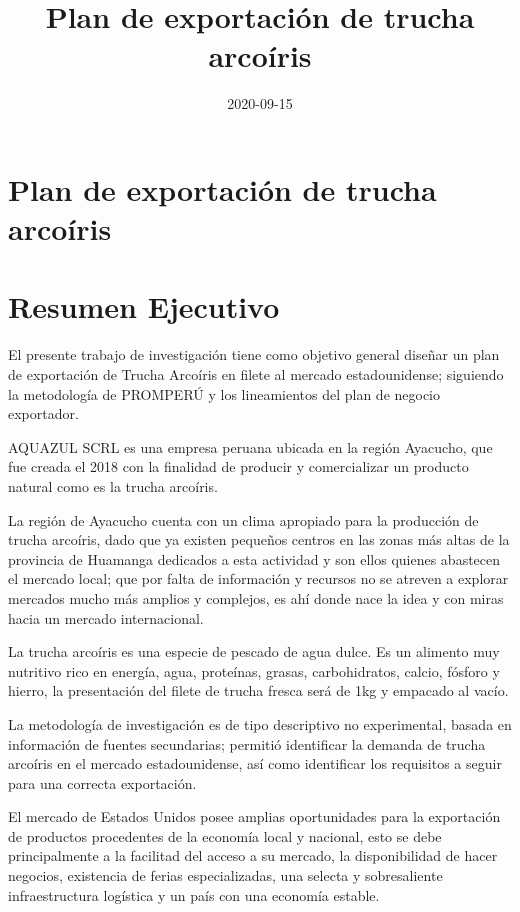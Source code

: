 \documentclass[
  stu,
  floatsintext,
  longtable,
  a4paper,
  nolmodern,
  notxfonts,
  notimes,
  12pt,
  colorlinks=true,linkcolor=blue,citecolor=blue,urlcolor=blue]{apa7}
\title{Plan de exportación de trucha arcoíris}
\date{2020-09-15}
\begin{document}
\maketitle


\hypertarget{toc}{}
\tableofcontents
\newpage
\section[Introduction]{Plan de exportación de trucha arcoíris}

\setcounter{secnumdepth}{3}

\setlength\LTleft{0pt}




\section{Resumen Ejecutivo}\label{resumen-ejecutivo}

El presente trabajo de investigación tiene como objetivo general diseñar
un plan de exportación de Trucha Arcoíris en filete al mercado
estadounidense; siguiendo la metodología de PROMPERÚ y los lineamientos
del plan de negocio exportador.

AQUAZUL SCRL es una empresa peruana ubicada en la región Ayacucho, que
fue creada el 2018 con la finalidad de producir y comercializar un
producto natural como es la trucha arcoíris.

La región de Ayacucho cuenta con un clima apropiado para la producción
de trucha arcoíris, dado que ya existen pequeños centros en las zonas
más altas de la provincia de Huamanga dedicados a esta actividad y son
ellos quienes abastecen el mercado local; que por falta de información y
recursos no se atreven a explorar mercados mucho más amplios y
complejos, es ahí donde nace la idea y con miras hacia un mercado
internacional.

La trucha arcoíris es una especie de pescado de agua dulce. Es un
alimento muy nutritivo rico en energía, agua, proteínas, grasas,
carbohidratos, calcio, fósforo y hierro, la presentación del filete de
trucha fresca será de 1kg y empacado al vacío.

La metodología de investigación es de tipo descriptivo no experimental,
basada en información de fuentes secundarias; permitió identificar la
demanda de trucha arcoíris en el mercado estadounidense, así como
identificar los requisitos a seguir para una correcta exportación.

El mercado de Estados Unidos posee amplias oportunidades para la
exportación de productos procedentes de la economía local y nacional,
esto se debe principalmente a la facilitad del acceso a su mercado, la
disponibilidad de hacer negocios, existencia de ferias especializadas,
una selecta y sobresaliente infraestructura logística y un país con una
economía estable.
\end{document}
